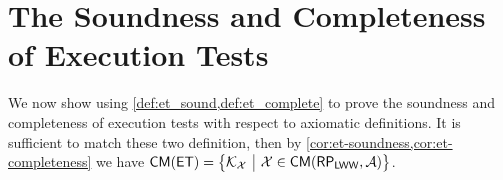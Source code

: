 \section{The Soundness and Completeness of Execution Tests}
\label{app:et_sound_complete}
We now show using \cref{def:et_sound,def:et_complete} to prove the soundness and completeness of execution tests with respect to axiomatic definitions.
It is sufficient to match these two definition, 
then by \cref{cor:et-soundness,cor:et-completeness} we have \( \CMs(\ET) = \Setcon{\mkvs_\aexec}{\aexec \in \CMa(\RP_{\LWW},\Ax)} \).
\label{sec:kv-sound-complete-proof}
\label{sec:spec-proof}










